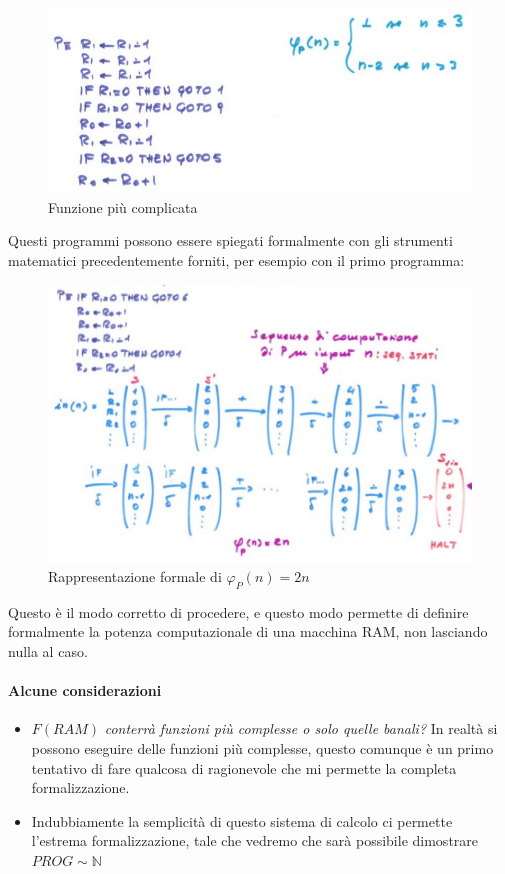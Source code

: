 \documentclass{article}
\begin{document}
\begin{figure}[H]
    \centering
    \includegraphics[scale=0.5]{images/n_complx.png}
    \caption{Funzione più complicata}
\end{figure}

Questi programmi possono essere spiegati formalmente con gli strumenti matematici precedentemente
forniti, per esempio con il primo programma:

\begin{figure}[H]
    \centering
    \includegraphics[scale=0.4]{images/n_formale.png}
    \caption{Rappresentazione formale di $\varphi_P(n)=2n$}
\end{figure}

Questo è il modo corretto di procedere, e questo modo permette di definire formalmente
la potenza computazionale di una macchina RAM, non lasciando nulla al caso.

\paragraph{Alcune considerazioni}
\begin{itemize}
    \item $F(RAM)$ \textit{conterrà funzioni più complesse o solo quelle banali?} In realtà
          si possono eseguire delle funzioni più complesse, questo comunque è un primo
          tentativo di fare qualcosa di ragionevole che mi permette la completa formalizzazione.
    \item Indubbiamente la semplicità di questo sistema di calcolo ci permette l'estrema
          formalizzazione, tale che vedremo che sarà possibile dimostrare $PROG\sim\mathbb{N}$
\end{itemize}
\end{document}

